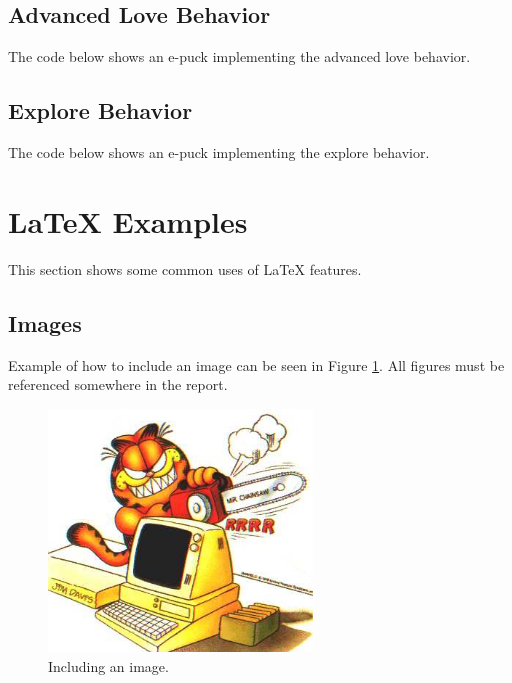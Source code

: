 \documentclass[12pt,a4paper]{article}
\begin{document}
\subsection{Advanced Love Behavior} \label{app:advLove} %
The code below shows an e-puck implementing the advanced love behavior.



\subsection{Explore Behavior} \label{app:expl} %
The code below shows an e-puck implementing the explore behavior.


\section{\LaTeX{} Examples} %
This section shows some common uses of \LaTeX{} features.
\subsection{Images}
Example of how to include an image can be seen in Figure \ref{fig:graphicfile}. All figures must be referenced somewhere in the report.
\begin{figure}[htb]
\begin{center}
\includegraphics[width=7cm]{garfield}
\caption{Including an image.}
\label{fig:graphicfile} %
\end{center}
\end{figure}
\end{document}
